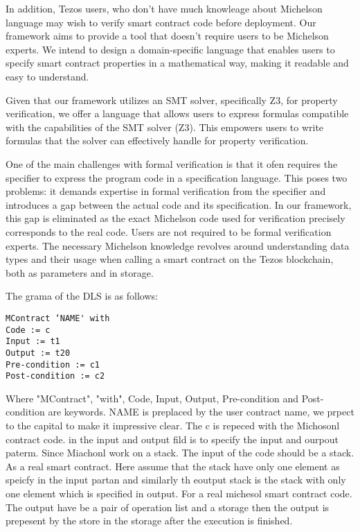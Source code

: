 \documentclass[a4paper,UKenglish,cleveref, autoref, thm-restate]{lipics-v2021}
\begin{document}
In addition, Tezos users, who don't have much knowleage about Michelson language may wish to verify smart contract code before deployment. Our framework aims to provide a tool that doesn't require users to be Michelson experts. We intend to design a domain-specific language that enables users to specify smart contract properties in a mathematical way, making it readable and easy  to understand.

Given that our framework utilizes an SMT solver, specifically Z3, for property verification, we offer a language that allows users to express formulas compatible with the capabilities of the SMT solver (Z3). This empowers users to write formulas that the solver can effectively handle for property verification.

One of the main challenges with formal verification is that it ofen requires the specifier to express the program code in a specification language. This poses two problems: it demands expertise in formal verification from the specifier and introduces a gap between the actual code and its specification. In our framework, this gap is eliminated as the exact Michelson code used for verification precisely corresponds to the real code. Users are not required to be formal verification experts. The necessary Michelson knowledge revolves around understanding data types and their usage when calling a smart contract on the Tezos blockchain, both as parameters and in storage. 

The grama of the DLS is as follows:

\begin{verbatim}
MContract ‘NAME' with
Code := c
Input := t1
Output := t20
Pre-condition := c1
Post-condition := c2
\end{verbatim}

Where "MContract", "with", Code, Input, Output, Pre-condition and Post-condition are keywords. NAME is preplaced by the user contract name, we prpect to the capital to make it impressive clear. The c is repeced with the Michosonl contract code. in the input and output fild is to specify the input and ourpout paterm. Since Miachonl work on a stack. The input of the code should be a stack. As a real smart contract. Here assume that the stack have only one element as speicfy in the input partan and similarly th eoutput stack is the stack with only one element which is specified in output. For a real michesol smart contract code. The output have be a pair of operation list and a storage then the output is prepesent by the store in the storage after the execution is finished. 
\end{document}
